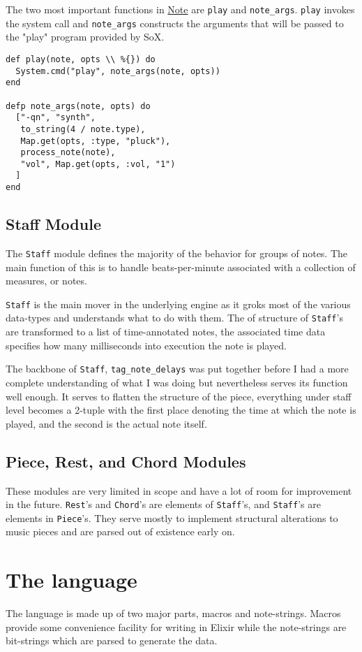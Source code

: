 \documentclass[11pt]{article}
\begin{document}
The two most important functions in \href{lib/harpsi.ex}{Note} are \texttt{play} and
\texttt{note\_args}. \texttt{play} invokes the system call and \texttt{note\_args}
constructs the arguments that will be passed to the "play" program
provided by SoX.
\begin{verbatim}
def play(note, opts \\ %{}) do
  System.cmd("play", note_args(note, opts))
end

defp note_args(note, opts) do
  ["-qn", "synth",
   to_string(4 / note.type),
   Map.get(opts, :type, "pluck"),
   process_note(note),
   "vol", Map.get(opts, :vol, "1")
  ]
end
\end{verbatim}

\subsection{Staff Module}
\label{sec-2-2}
The \texttt{Staff} module defines the majority of the behavior for groups
of notes. The main function of this is to handle beats-per-minute
associated with a collection of measures, or notes.

\texttt{Staff} is the main mover in the underlying engine as it groks most
of the various data-types and understands what to do with
them. The of structure of \texttt{Staff}'s are transformed to
a list of time-annotated notes, the associated time data specifies
how many milliseconds into execution the note is played.

The backbone of \texttt{Staff}, \texttt{tag\_note\_delays} was put together before
I had a more complete understanding of what I was doing but
nevertheless serves its function well enough. It serves to flatten
the structure of the piece, everything under staff level becomes a
2-tuple with the first place denoting the time at which the note is
played, and the second is the actual note itself.

\subsection{Piece, Rest, and Chord Modules}
\label{sec-2-3}
These modules are very limited in scope and have a lot of room for
improvement in the future. \texttt{Rest}'s and \texttt{Chord}'s are elements of
\texttt{Staff}'s, and \texttt{Staff}'s are elements in \texttt{Piece}'s. They serve
mostly to implement structural alterations to music pieces and are
parsed out of existence early on.

\section{The language}
\label{sec-3}
The language is made up of two major parts, macros and
note-strings. Macros provide some convenience facility for writing
in Elixir while the note-strings are bit-strings which are parsed to
generate the data.
\end{document}
